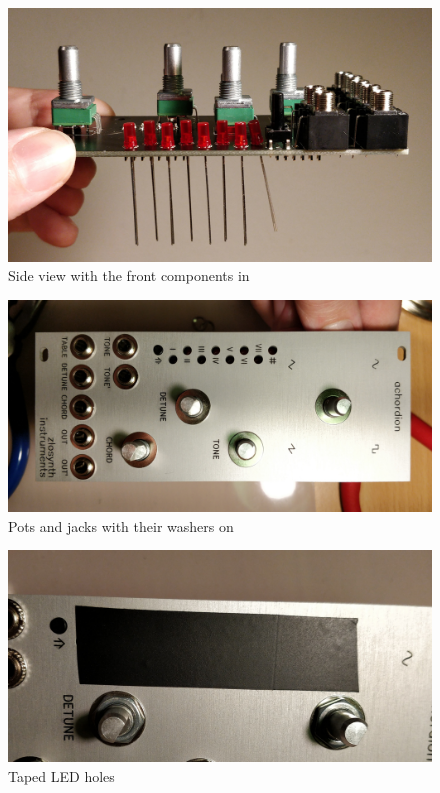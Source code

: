\documentclass[10pt,a4paper,twocolumn]{article}
\begin{document}
\begin{figure}[p]
  \centering
  \includegraphics[width=\linewidth]{p07.jpg}
  \caption{Side view with the front components in}
  \label{front components}
\end{figure}

\begin{figure}[p]
  \centering
  \includegraphics[width=\linewidth]{p08.jpg}
  \caption{Pots and jacks with their washers on}
  \label{washers}
\end{figure}

\begin{figure}[p]
  \centering
  \includegraphics[width=\linewidth]{p09.jpg}
  \caption{Taped LED holes}
  \label{masking}
\end{figure}
\end{document}
